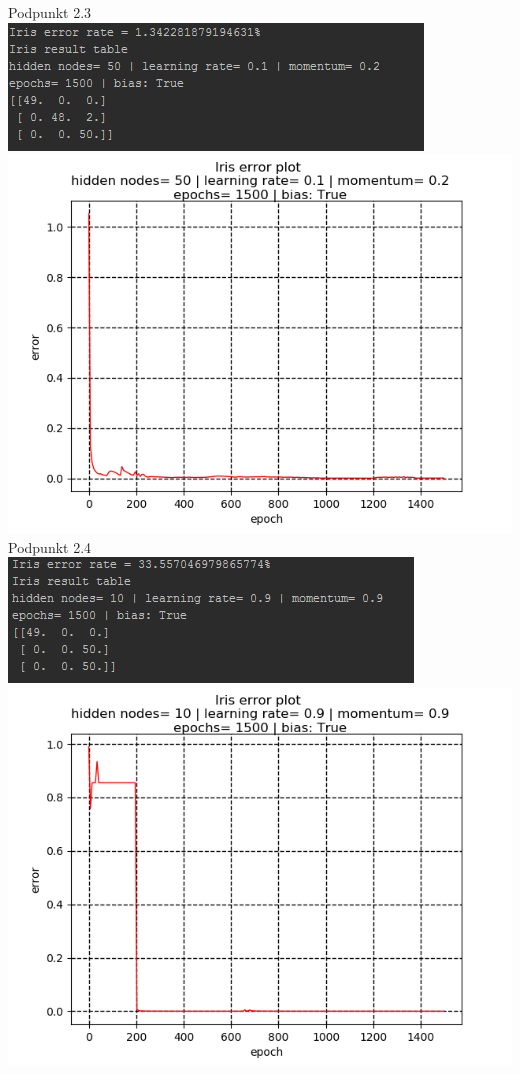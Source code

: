 \documentclass{classrep}
\begin{document}
{Podpunkt 2.3\\
\includegraphics{imgs/231.png}\\
\includegraphics{imgs/232.png}\\
Podpunkt 2.4\\
\includegraphics{imgs/241.png}\\
\includegraphics{imgs/242.png}\\
}
\end{document}
